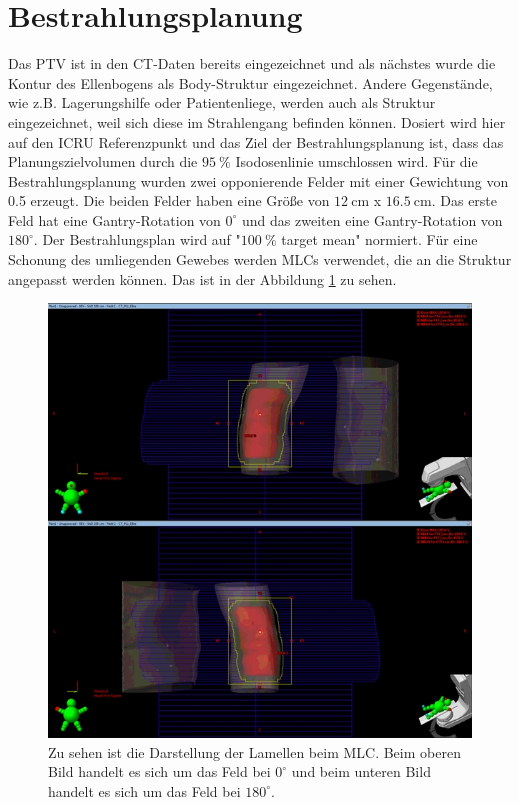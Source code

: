 \section{Bestrahlungsplanung}
\label{sec:Bestrahlung}
Das PTV ist in den CT-Daten bereits eingezeichnet und als nächstes wurde die Kontur des Ellenbogens als Body-Struktur eingezeichnet.
Andere Gegenstände, wie z.B. Lagerungshilfe oder Patientenliege, werden auch als Struktur eingezeichnet, weil sich diese im Strahlengang befinden können.
Dosiert wird hier auf den ICRU Referenzpunkt und das Ziel der Bestrahlungsplanung ist, dass das Planungszielvolumen durch die $\SI{95}{\percent}$
Isodosenlinie umschlossen wird. Für die Bestrahlungsplanung wurden zwei opponierende Felder mit einer
Gewichtung von 0.5 erzeugt. Die beiden Felder haben eine Größe von $\SI{12}{\centi\meter}$ x $\SI{16,5}{\centi\meter}$.
Das erste Feld hat eine Gantry-Rotation von $0^\circ$ und das zweiten eine Gantry-Rotation von $180^\circ$.
Der Bestrahlungsplan wird auf "$\SI{100}{\percent}$ target mean" normiert. Für eine Schonung des umliegenden Gewebes werden MLCs verwendet,
die an die Struktur angepasst werden können. Das ist in der Abbildung \ref{fig:kombi} zu sehen.

\begin{figure}[H]
	\centering
	\includegraphics[width=\textwidth]{../Bilder/kombi.jpg}
	\caption{Zu sehen ist die Darstellung der Lamellen beim MLC. Beim oberen Bild handelt es sich um das Feld bei $0^\circ$ und beim unteren Bild handelt es sich um das Feld bei $180^\circ$.}
	\label{fig:kombi}
\end{figure}


